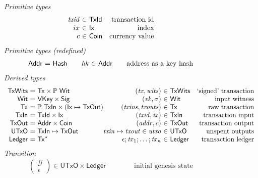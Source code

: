 \documentclass[11pt,a4paper]{article}
\newcommand{\powerset}[1]{\mathbb{P}~#1}
\newcommand{\sequencetype}[1]{#1^\star}
\newcommand{\var}[1]{\mathit{#1}}
\newcommand{\type}[1]{\mathsf{#1}}
\begin{document}
\begin{figure}
\emph{Primitive types}
%
\begin{equation*}
\begin{array}{r@{~\in~}lr}
  \var{txid}
& \type{TxId}
& \text{transaction id}
\\
  ix
& \type{Ix}
& \text{index}
\\
  c
& \type{Coin}
& \text{currency value}
\end{array}
\end{equation*}
%
\emph{Primitive types (redefined)}
%
\begin{equation*}
\begin{array}{r@{~=~}l@{\qquad}r@{~\in~}l@{\qquad}r}
  \type{Addr}
& \type{Hash}
& \var{hk}
& \type{Addr}
& \text{address as a key hash}
\end{array}
\end{equation*}
%
\emph{Derived types}
%
\begin{equation*}
\begin{array}{r@{~=~}l@{}r@{~\in~}lr}
  \type{TxWits}
& \type{Tx} \times \powerset{\type{Wit}}
& (\var{tx}, \var{wits})
& \type{TxWits}
& \text{`signed' transaction}
\\
  \type{Wit}
& \type{VKey} \times \type{Sig}
& (\var{vk}, \sigma)
& \type{Wit}
& \text{input witness}
\\
  \type{Tx}
& \powerset{\type{TxIn}} \times (\type{Ix} \mapsto \type{TxOut})
& (\var{txins}, \var{txouts})
& \type{Tx}
& \text{raw transaction}
\\
  \type{TxIn}
& \type{TxId} \times \type{Ix}
& (\var{txid}, \var{ix})
& \type{TxIn}
& \text{transaction input}
\\
  \type{TxOut}
& \type{Addr} \times \type{Coin}
& (\var{addr}, c)
& \type{TxOut}
& \text{transaction output}
\\
  \type{UTxO}
& \type{TxIn} \mapsto \type{TxOut}
& \var{txin} \mapsto \var{txout} \in \var{utxo}
& \type{UTxO}
& \text{unspent outputs}
\\
  \type{Ledger}
& \sequencetype{\type{Tx}}
& \epsilon ; \var{tx}_1 ; \ldots ; \var{tx}_n 
& \type{Ledger}
& \text{transaction ledger}
\end{array}
\end{equation*}
%
\emph{Transition}
%
\begin{equation*}
  \left(\begin{array}{r}
    \mathcal{G} \\
    \epsilon
  \end{array}\right)
  \in \type{UTxO} \times \type{Ledger}
\qquad\qquad
\text{initial genesis state}
\end{equation*}


\end{figure}
\end{document}
